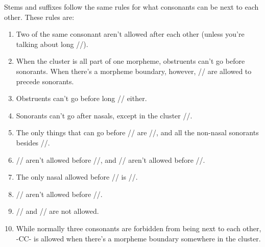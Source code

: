 Stems and suffixes follow the same rules for what consonants can be next to
each other. These rules are:
\begin{enumerate}
  \item Two of the same consonant aren't allowed after each other (unless you're
    talking about long //).
  \item When the cluster is all part of one morpheme, obstruents can't go before
    sonorants. When there's a morpheme boundary, however, // are
    allowed to precede sonorants.
  \item Obstruents can't go before long // either.
  \item Sonorants can't go after nasals, except in the cluster //.
  \item The only things that can go before // are //, and all the
    non-nasal sonorants besides //.
  \item // aren't allowed before //, and // aren't
    allowed before //.
  \item The only nasal allowed before // is //.
  \item // aren't allowed before //.
  \item // and // are not allowed.
  \item While normally three consonants are forbidden from being next to each
    other, -CC- is allowed when there's a morpheme boundary somewhere in
    the cluster.
\end{enumerate}

